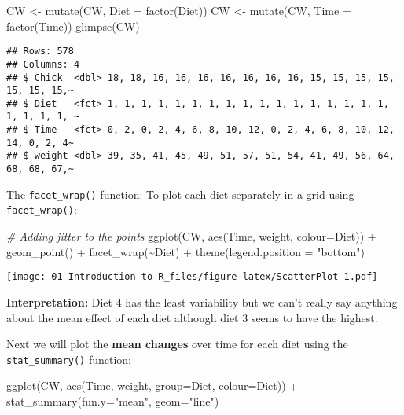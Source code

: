 \documentclass[
]{book}
\newenvironment{Shaded}{\begin{snugshade}}{\end{snugshade}}
\newcommand{\AttributeTok}[1]{\textcolor[rgb]{0.77,0.63,0.00}{#1}}
\newcommand{\CommentTok}[1]{\textcolor[rgb]{0.56,0.35,0.01}{\textit{#1}}}
\newcommand{\FunctionTok}[1]{\textcolor[rgb]{0.00,0.00,0.00}{#1}}
\newcommand{\NormalTok}[1]{#1}
\newcommand{\OtherTok}[1]{\textcolor[rgb]{0.56,0.35,0.01}{#1}}
\newcommand{\SpecialCharTok}[1]{\textcolor[rgb]{0.00,0.00,0.00}{#1}}
\newcommand{\StringTok}[1]{\textcolor[rgb]{0.31,0.60,0.02}{#1}}
\begin{document}
\begin{Shaded}
\begin{Highlighting}[]
\NormalTok{CW }\OtherTok{\textless{}{-}} \FunctionTok{mutate}\NormalTok{(CW, }\AttributeTok{Diet =} \FunctionTok{factor}\NormalTok{(Diet))}
\NormalTok{CW }\OtherTok{\textless{}{-}} \FunctionTok{mutate}\NormalTok{(CW, }\AttributeTok{Time =} \FunctionTok{factor}\NormalTok{(Time))}
\FunctionTok{glimpse}\NormalTok{(CW)}
\end{Highlighting}
\end{Shaded}

\begin{verbatim}
## Rows: 578
## Columns: 4
## $ Chick  <dbl> 18, 18, 16, 16, 16, 16, 16, 16, 16, 15, 15, 15, 15, 15, 15, 15,~
## $ Diet   <fct> 1, 1, 1, 1, 1, 1, 1, 1, 1, 1, 1, 1, 1, 1, 1, 1, 1, 1, 1, 1, 1, ~
## $ Time   <fct> 0, 2, 0, 2, 4, 6, 8, 10, 12, 0, 2, 4, 6, 8, 10, 12, 14, 0, 2, 4~
## $ weight <dbl> 39, 35, 41, 45, 49, 51, 57, 51, 54, 41, 49, 56, 64, 68, 68, 67,~
\end{verbatim}

The \texttt{facet\_wrap()} function: To plot each diet separately in a grid using \texttt{facet\_wrap()}:

\begin{Shaded}
\begin{Highlighting}[]
\CommentTok{\# Adding jitter to the points}
\FunctionTok{ggplot}\NormalTok{(CW, }\FunctionTok{aes}\NormalTok{(Time, weight, }\AttributeTok{colour=}\NormalTok{Diet)) }\SpecialCharTok{+}
  \FunctionTok{geom\_point}\NormalTok{() }\SpecialCharTok{+}
  \FunctionTok{facet\_wrap}\NormalTok{(}\SpecialCharTok{\textasciitilde{}}\NormalTok{Diet) }\SpecialCharTok{+}
  \FunctionTok{theme}\NormalTok{(}\AttributeTok{legend.position =} \StringTok{"bottom"}\NormalTok{)}
\end{Highlighting}
\end{Shaded}

\texttt{[image: 01-Introduction-to-R\_files/figure-latex/ScatterPlot-1.pdf]}

\textbf{Interpretation:} Diet 4 has the least variability but we can't really say anything about the mean effect
of each diet although diet 3 seems to have the highest.

Next we will plot the \textbf{mean changes} over time for each diet using the \texttt{stat\_summary()} function:

\begin{Shaded}
\begin{Highlighting}[]
\FunctionTok{ggplot}\NormalTok{(CW, }\FunctionTok{aes}\NormalTok{(Time, weight, }
               \AttributeTok{group=}\NormalTok{Diet, }\AttributeTok{colour=}\NormalTok{Diet)) }\SpecialCharTok{+}
  \FunctionTok{stat\_summary}\NormalTok{(}\AttributeTok{fun.y=}\StringTok{"mean"}\NormalTok{, }\AttributeTok{geom=}\StringTok{"line"}\NormalTok{) }
\end{Highlighting}
\end{Shaded}
\end{document}
